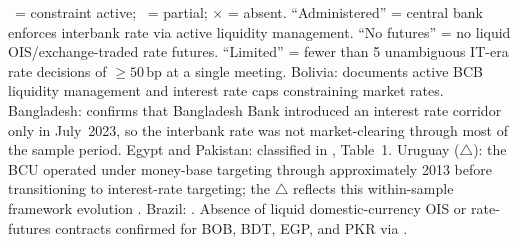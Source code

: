 \begin{tablenotes}
\small \cmark\ = constraint active; \warnmark\ = partial; $\times$ = absent.
``Administered'' = central bank enforces interbank rate via active liquidity management.
``No futures'' = no liquid OIS/exchange-traded rate futures.
``Limited'' = fewer than 5 unambiguous IT-era rate decisions of $\geq50$\,bp at a single meeting.
Bolivia: \citet{imf2025bolivia} documents active BCB liquidity management and
interest rate caps constraining market rates.
Bangladesh: \citet{imf2023bangladesh} confirms that Bangladesh Bank introduced
an interest rate corridor only in July~2023, so the interbank rate was not
market-clearing through most of the sample period.
Egypt and Pakistan: classified in \citet{ha2025}, Table~1.
Uruguay ($\triangle$): the BCU operated under money-base targeting through
approximately 2013 before transitioning to interest-rate targeting; the
$\triangle$ reflects this within-sample framework evolution
\citep{imf2022uruguay, imf2015uruguay_wp}.
Brazil: \citet{caldara2019}.
Absence of liquid domestic-currency OIS or rate-futures contracts confirmed
for BOB, BDT, EGP, and PKR via \citet{bis2022triennial}.
\end{tablenotes}
